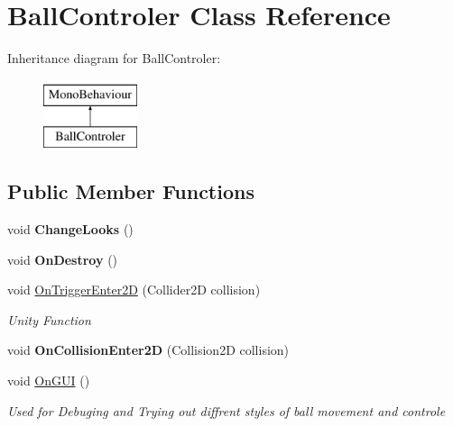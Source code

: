 \hypertarget{class_ball_controler}{}\section{Ball\+Controler Class Reference}
\label{class_ball_controler}
Inheritance diagram for Ball\+Controler\+:\begin{figure}[H]
\begin{center}
\leavevmode
\includegraphics[height=2.000000cm]{class_ball_controler}
\end{center}
\end{figure}
\subsection*{Public Member Functions}
\begin{DoxyCompactItemize}
\item 
void {\bfseries Change\+Looks} ()\hypertarget{class_ball_controler_a20f57ca6f864ef88c44a30b5a5fbae78}{}\label{class_ball_controler_a20f57ca6f864ef88c44a30b5a5fbae78}

\item 
void {\bfseries On\+Destroy} ()\hypertarget{class_ball_controler_adcd8fd481b8cdbf863fbf1e0414d45ef}{}\label{class_ball_controler_adcd8fd481b8cdbf863fbf1e0414d45ef}

\item 
void \hyperlink{class_ball_controler_a9fb2063e78fe75661acf869260983fe1}{On\+Trigger\+Enter2D} (Collider2D collision)
\begin{DoxyCompactList}\small\item\em Unity Function \end{DoxyCompactList}\item 
void {\bfseries On\+Collision\+Enter2D} (Collision2D collision)\hypertarget{class_ball_controler_a44a2da33549da48edc7cd96ac416aad4}{}\label{class_ball_controler_a44a2da33549da48edc7cd96ac416aad4}

\item 
void \hyperlink{class_ball_controler_af9395a10c7752d3c1606837417336295}{On\+G\+UI} ()
\begin{DoxyCompactList}\small\item\em Used for Debuging and Trying out diffrent styles of ball movement and controle \end{DoxyCompactList}\end{DoxyCompactItemize}


